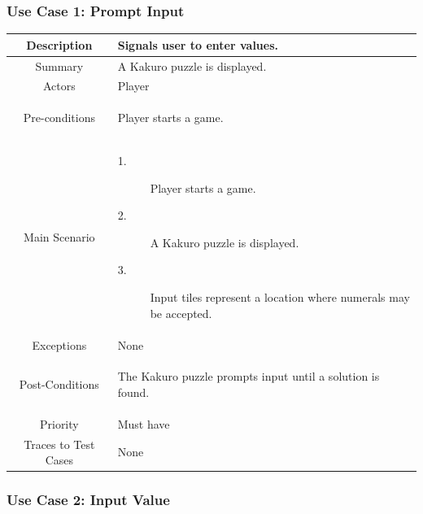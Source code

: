 \documentclass[12pt]{article}
\begin{document}
\newpage
\pagestyle{plain}
\subsubsection{Use Case 1: Prompt Input} \label{uc:1}

\begin{table}[htbp]
\begin{center}
\begin{tabular}{| c | m{10cm} |}
\hline
\cellcolor{lightgray}Description & Signals user to enter values. \\
\hline
\cellcolor{lightgray}Summary & A Kakuro puzzle is displayed. \\
\hline
\cellcolor{lightgray}Actors & Player \\
\hline
\cellcolor{lightgray}Pre-conditions &
\begin{description}[font=$\bullet$~\normalfont\scshape]
\item Player starts a game.
\end{description}\\
\hline
\cellcolor{lightgray}Main Scenario & 
\begin{description}
\item [1.]Player starts a game.
\item [2.]A Kakuro puzzle is displayed. 
\item [3.]Input tiles represent a location where numerals may be accepted.
\end{description}\\
\hline
\cellcolor{lightgray}Exceptions & None \\
\hline
\cellcolor{lightgray}Post-Conditions & 
\begin{description}[font=$\bullet$~\normalfont\scshape]
\item The Kakuro puzzle prompts input until a solution is found.
\end{description}\\
\hline
\cellcolor{lightgray}Priority & Must have \\
\hline
\cellcolor{lightgray}Traces to Test Cases & None \\
\hline
\end{tabular}
\end{center}
\end{table}

\newpage
\pagestyle{plain} 
\subsubsection{Use Case 2: Input Value} \label{uc:1}
\end{document}
